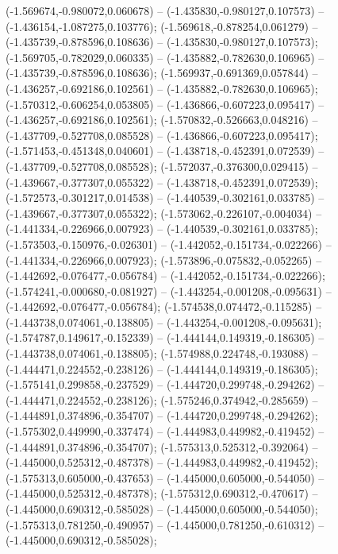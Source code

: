  (-1.569674,-0.980072,0.060678) -- (-1.435830,-0.980127,0.107573) -- (-1.436154,-1.087275,0.103776);
 (-1.569618,-0.878254,0.061279) -- (-1.435739,-0.878596,0.108636) -- (-1.435830,-0.980127,0.107573);
 (-1.569705,-0.782029,0.060335) -- (-1.435882,-0.782630,0.106965) -- (-1.435739,-0.878596,0.108636);
 (-1.569937,-0.691369,0.057844) -- (-1.436257,-0.692186,0.102561) -- (-1.435882,-0.782630,0.106965);
 (-1.570312,-0.606254,0.053805) -- (-1.436866,-0.607223,0.095417) -- (-1.436257,-0.692186,0.102561);
 (-1.570832,-0.526663,0.048216) -- (-1.437709,-0.527708,0.085528) -- (-1.436866,-0.607223,0.095417);
 (-1.571453,-0.451348,0.040601) -- (-1.438718,-0.452391,0.072539) -- (-1.437709,-0.527708,0.085528);
 (-1.572037,-0.376300,0.029415) -- (-1.439667,-0.377307,0.055322) -- (-1.438718,-0.452391,0.072539);
 (-1.572573,-0.301217,0.014538) -- (-1.440539,-0.302161,0.033785) -- (-1.439667,-0.377307,0.055322);
 (-1.573062,-0.226107,-0.004034) -- (-1.441334,-0.226966,0.007923) -- (-1.440539,-0.302161,0.033785);
 (-1.573503,-0.150976,-0.026301) -- (-1.442052,-0.151734,-0.022266) -- (-1.441334,-0.226966,0.007923);
 (-1.573896,-0.075832,-0.052265) -- (-1.442692,-0.076477,-0.056784) -- (-1.442052,-0.151734,-0.022266);
 (-1.574241,-0.000680,-0.081927) -- (-1.443254,-0.001208,-0.095631) -- (-1.442692,-0.076477,-0.056784);
 (-1.574538,0.074472,-0.115285) -- (-1.443738,0.074061,-0.138805) -- (-1.443254,-0.001208,-0.095631);
 (-1.574787,0.149617,-0.152339) -- (-1.444144,0.149319,-0.186305) -- (-1.443738,0.074061,-0.138805);
 (-1.574988,0.224748,-0.193088) -- (-1.444471,0.224552,-0.238126) -- (-1.444144,0.149319,-0.186305);
 (-1.575141,0.299858,-0.237529) -- (-1.444720,0.299748,-0.294262) -- (-1.444471,0.224552,-0.238126);
 (-1.575246,0.374942,-0.285659) -- (-1.444891,0.374896,-0.354707) -- (-1.444720,0.299748,-0.294262);
 (-1.575302,0.449990,-0.337474) -- (-1.444983,0.449982,-0.419452) -- (-1.444891,0.374896,-0.354707);
 (-1.575313,0.525312,-0.392064) -- (-1.445000,0.525312,-0.487378) -- (-1.444983,0.449982,-0.419452);
 (-1.575313,0.605000,-0.437653) -- (-1.445000,0.605000,-0.544050) -- (-1.445000,0.525312,-0.487378);
 (-1.575312,0.690312,-0.470617) -- (-1.445000,0.690312,-0.585028) -- (-1.445000,0.605000,-0.544050);
 (-1.575313,0.781250,-0.490957) -- (-1.445000,0.781250,-0.610312) -- (-1.445000,0.690312,-0.585028);
